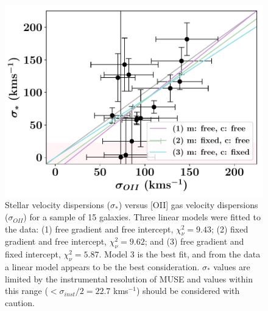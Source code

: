 \documentclass[12pt, twocolumn]{revtex4-1}    %
\begin{document}

\begin{figure}
\includegraphics[width=1.0\linewidth]{data/sigma_star_vs_sigma_oii}
\caption{Stellar velocity dispersions ($\sigma_*$) versus [OII] gas velocity dispersions ($\sigma_{OII}$) for a sample of 15 galaxies. Three linear models were fitted to the data: (1) free gradient and free intercept, $\chi^2_{\nu}=9.43$; (2) fixed gradient and free intercept, $\chi^2_\nu=9.62$; and (3) free gradient and fixed intercept, $\chi^2_\nu=5.87$. Model 3 is the best fit, and from the data a linear model appears to be the best consideration. $\sigma_*$ values are limited by the instrumental resolution of MUSE and values within this range ($<\sigma_{inst}/2=22.7$ kms$^{-1}$) should be considered with caution.  }
\label{fig:velocity_dispersions}
\end{figure}
\end{document}
